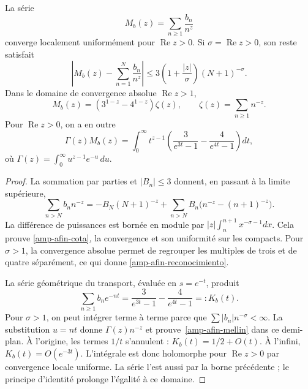 \begin{theorem}
\label{amp-afin-thm-momentos}
La série
\begin{equation}
 M_b(z)=\sum_{n\geq1}\frac{b_n}{n^z}
 \label{amp-afin-momento}
\end{equation}
converge localement uniformément pour $\operatorname{Re}z>0$.
Si $\sigma=\operatorname{Re}z>0$, son reste satisfait
\begin{equation}
 \left|M_b(z)-\sum_{n=1}^{N}\frac{b_n}{n^z}\right|
 \leq3\left(1+\frac{|z|}{\sigma}\right)(N+1)^{-\sigma}.
 \label{amp-afin-cota}
\end{equation}
Dans le domaine de convergence absolue $\operatorname{Re}z>1$,
\begin{equation}
 M_b(z)=(3^{1-z}-4^{1-z})\zeta(z),\qquad
 \zeta(z)=\sum_{n\geq1}n^{-z}.
 \label{amp-afin-reconocimiento}
\end{equation}
Pour $\operatorname{Re}z>0$, on a en outre
\begin{equation}
 \Gamma(z)M_b(z)=
 \int_0^\infty t^{z-1}
 \left(\frac3{e^{3t}-1}-\frac4{e^{4t}-1}\right)dt,
 \label{amp-afin-mellin}
\end{equation}
où $\Gamma(z)=\int_0^\infty u^{z-1}e^{-u}\,du$.
\end{theorem}
\begin{proof}
La sommation par parties et $|B_n|\leq3$ donnent, en passant à la limite supérieure,
\[
 \sum_{n>N}b_n n^{-z}
 =-B_N(N+1)^{-z}
   +\sum_{n>N}B_n\bigl(n^{-z}-(n+1)^{-z}\bigr).
\]
La différence de puissances est bornée en module par
$|z|\int_n^{n+1}x^{-\sigma-1}dx$. Cela prouve
\eqref{amp-afin-cota}, la convergence et son uniformité sur les compacts.
Pour $\sigma>1$, la convergence absolue permet de regrouper
les multiples de trois et de quatre séparément, ce qui donne
\eqref{amp-afin-reconocimiento}.

La série géométrique du transport, évaluée en $s=e^{-t}$, produit
\[
 \sum_{n\geq1}b_n e^{-nt}
 =\frac3{e^{3t}-1}-\frac4{e^{4t}-1}=:K_b(t).
\]
Pour $\sigma>1$, on peut intégrer terme à terme parce que
$\sum|b_n|n^{-\sigma}<\infty$. La substitution $u=nt$ donne
$\Gamma(z)n^{-z}$ et prouve~\eqref{amp-afin-mellin} dans ce demi-plan.
À l’origine, les termes $1/t$ s’annulent :
$K_b(t)=1/2+O(t)$. À l’infini, $K_b(t)=O(e^{-3t})$.
L’intégrale est donc holomorphe pour $\operatorname{Re}z>0$
par convergence locale uniforme. La série l’est aussi par la borne
précédente ; le principe d’identité prolonge l’égalité à ce domaine.
\end{proof}

